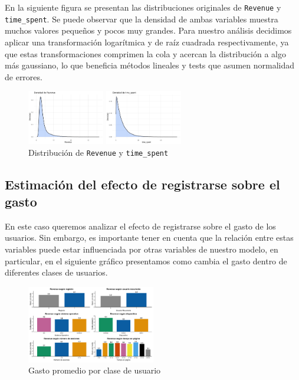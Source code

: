 \documentclass[conference]{IEEEtran}
\begin{document}
En la siguiente figura se presentan las distribuciones originales de \texttt{Revenue} y \texttt{time\_spent}.
Se puede observar que la densidad de ambas variables muestra muchos valores pequeños y pocos muy grandes.
Para nuestro análisis decidimos aplicar una transformación logarítmica y de raíz cuadrada respectivamente,
ya que estas transformaciones comprimen la cola y acercan la distribución a algo más gaussiano, 
lo que beneficia métodos lineales y tests que asumen normalidad de errores.


\begin{figure}[H]
    \centering
    \includegraphics[width=0.3\textwidth]{figures/revenueA.png}

    \includegraphics[width=0.3\textwidth]{figures/timespentA.png}
    \caption{Distribución de \texttt{Revenue} y \texttt{time\_spent}}
    \label{fig:distribucion}
\end{figure}



\subsection{Estimación del efecto de registrarse sobre el gasto}

En este caso queremos analizar el efecto de registrarse sobre el gasto de los usuarios. 
Sin embargo, es importante tener en cuenta que la relación entre estas variables puede estar influenciada por otras variables de nuestro modelo, 
en particular, en el siguiente gráfico presentamos como cambia el gasto dentro de diferentes clases de usuarios.

\begin{figure}[H]
    \centering
    \includegraphics[width=0.5\textwidth]{figures/GastoA.png}
    \caption{Gasto promedio por clase de usuario}
    \label{fig:coefplot}
\end{figure}
\end{document}

